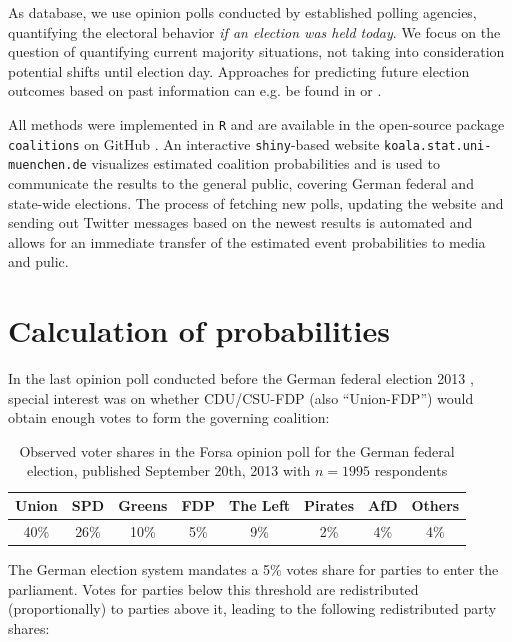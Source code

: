 \documentclass[smallcondensed]{svjour3}     %
\begin{document}
As database, we use opinion polls conducted by established polling agencies,
quantifying the electoral behavior \textit{if an election was held today}.
We focus on the question of quantifying current majority situations, not
taking into consideration potential shifts until election day.
Approaches for predicting future election outcomes based on past
information can e.g. be found in \citet{graefe_2017} or \citet{norpoth_gschwend_2010}.

All methods were implemented in \texttt{R} \citep{r_2017} and are available in the open-source
package \texttt{coalitions} on GitHub \citep{bender_bauer_2018}. An
interactive \texttt{shiny}-based \citep{chang_2017} website \texttt{koala.stat.uni-\allowbreak muenchen.\allowbreak de}
visualizes estimated coalition probabilities and is used to communicate the results to the general public, covering German federal and state-wide elections.
The process of fetching new polls, updating the website and sending out Twitter messages based on the newest results is automated and allows for an immediate transfer of the estimated event probabilities to media and pulic.



\section{Calculation of probabilities} \label{sec:method}
In the last opinion poll conducted before the German federal election 2013 \citep{forsa_2013}, special interest was on whether CDU/CSU-FDP (also ``Union-FDP'') would obtain enough votes to form the governing coalition:

\begin{table}[!ht]\centering
\caption{Observed voter shares in the Forsa opinion poll for the German federal election, published September 20th, 2013 with $n=1995$ respondents
\label{bauer:tab_fdp}
}
\medskip
\begin{tabular}{cccccccc}
\toprule[0.09 em]
Union & SPD & Greens & FDP & The Left & Pirates & AfD & Others \\
\midrule
40\% & 26\% & 10\% & 5\% & 9\% & 2\% & 4\% & 4\% \\
\bottomrule[0.09 em]
\end{tabular}
\end{table}

The German election system mandates a 5\% votes share for parties to enter the parliament.
Votes for parties below this threshold are redistributed (proportionally) to parties
above it, leading to the following redistributed party shares:
\end{document}
